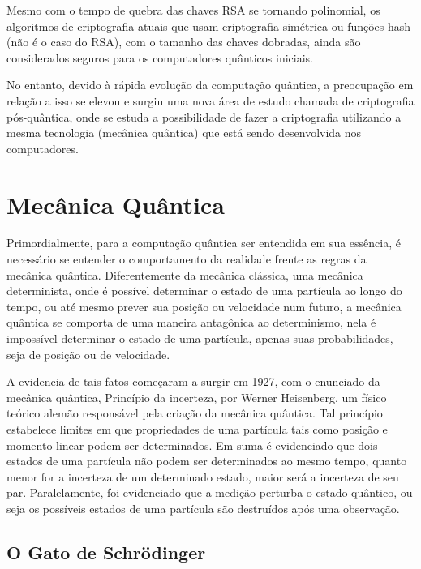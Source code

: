 \documentclass[
	12pt,				%
	oneside,			%
	a4paper,			%
	english,			%
	french,				%
	spanish,			%
	brazil,				%
	]{abntex2}
\begin{document}
Mesmo com o tempo de quebra das chaves RSA se tornando polinomial, os algoritmos de criptografia atuais que usam criptografia simétrica ou funções hash (não é o caso do RSA), com o tamanho das chaves dobradas, ainda são considerados seguros para os computadores quânticos iniciais. 

No entanto, devido à rápida evolução da computação quântica, a preocupação em relação a isso se elevou e surgiu uma nova área de estudo chamada de criptografia pós-quântica, onde se estuda a possibilidade de fazer a criptografia utilizando a mesma tecnologia (mecânica quântica) que está sendo desenvolvida nos computadores.

\chapter{Mecânica Quântica}

Primordialmente, para a computação quântica ser entendida em sua essência, é necessário se entender o comportamento da realidade frente as regras da mecânica quântica. Diferentemente da mecânica clássica, uma mecânica determinista, onde é possível determinar o estado de uma partícula ao longo do tempo, ou até mesmo prever sua posição ou velocidade num futuro, a mecânica quântica se comporta de uma maneira antagônica ao determinismo, nela é impossível determinar o estado de uma partícula, apenas suas probabilidades, seja de posição ou de velocidade.

A evidencia de tais fatos começaram a surgir em 1927, com o enunciado da mecânica quântica, Princípio da incerteza, por Werner Heisenberg, um físico teórico alemão responsável pela criação da mecânica quântica. Tal princípio estabelece limites em que propriedades de uma partícula tais como posição e momento linear podem ser determinados. Em suma é evidenciado que dois estados de uma partícula não podem ser determinados ao mesmo tempo, quanto menor for a incerteza de um determinado estado, maior será a incerteza de seu par. Paralelamente, foi evidenciado que a medição perturba o estado quântico, ou seja os possíveis estados de uma partícula são destruídos após uma observação.

\section{O Gato de Schrödinger}
\end{document}
